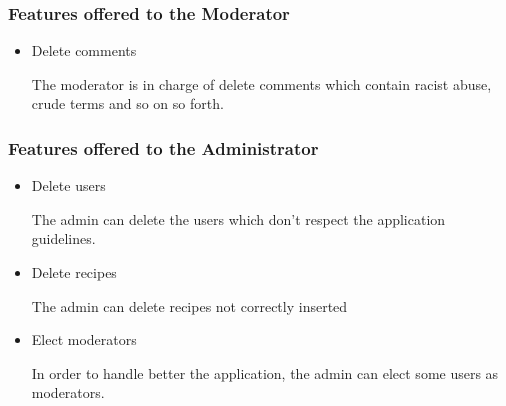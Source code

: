 \documentclass[a4paper]{report}
\begin{document}
\subsubsection{Features offered to the Moderator}
\begin{itemize}
	\item Delete comments
	
	\noindent The moderator is in charge of delete comments which contain racist abuse, crude terms and so on so forth.
\end{itemize}

\subsubsection{Features offered to the Administrator}
\begin{itemize}
	\item Delete users
	
	\noindent The admin can delete the users which don't respect the application guidelines.
	
	\item Delete recipes
	
	\noindent The admin can delete recipes not correctly inserted
	
	\item Elect moderators
	
	\noindent In order to handle better the application, the admin can elect some users as moderators.
\end{itemize}
\end{document}
